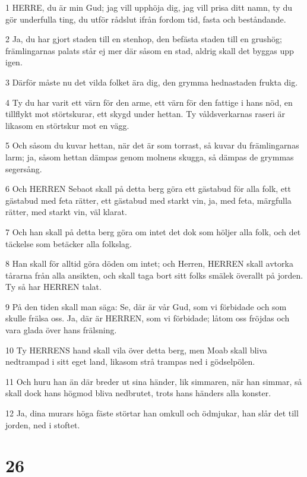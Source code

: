 \par 1 HERRE, du är min Gud; jag vill upphöja dig, jag vill prisa ditt namn, ty du gör underfulla ting, du utför rådslut ifrån fordom tid, fasta och beståndande.
\par 2 Ja, du har gjort staden till en stenhop, den befästa staden till en grushög; främlingarnas palats står ej mer där såsom en stad, aldrig skall det byggas upp igen.
\par 3 Därför måste nu det vilda folket ära dig, den grymma hednastaden frukta dig.
\par 4 Ty du har varit ett värn för den arme, ett värn för den fattige i hans nöd, en tillflykt mot störtskurar, ett skygd under hettan. Ty våldsverkarnas raseri är likasom en störtskur mot en vägg.
\par 5 Och såsom du kuvar hettan, när det är som torrast, så kuvar du främlingarnas larm; ja, såsom hettan dämpas genom molnens skugga, så dämpas de grymmas segersång.
\par 6 Och HERREN Sebaot skall på detta berg göra ett gästabud för alla folk, ett gästabud med feta rätter, ett gästabud med starkt vin, ja, med feta, märgfulla rätter, med starkt vin, väl klarat.
\par 7 Och han skall på detta berg göra om intet det dok som höljer alla folk, och det täckelse som betäcker alla folkslag.
\par 8 Han skall för alltid göra döden om intet; och Herren, HERREN skall avtorka tårarna från alla ansikten, och skall taga bort sitt folks smälek överallt på jorden. Ty så har HERREN talat.
\par 9 På den tiden skall man säga: Se, där är vår Gud, som vi förbidade och som skulle frälsa oss. Ja, där är HERREN, som vi förbidade; låtom oss fröjdas och vara glada över hans frälsning.
\par 10 Ty HERRENS hand skall vila över detta berg, men Moab skall bliva nedtrampad i sitt eget land, likasom strå trampas ned i gödselpölen.
\par 11 Och huru han än där breder ut sina händer, lik simmaren, när han simmar, så skall dock hans högmod bliva nedbrutet, trots hans händers alla konster.
\par 12 Ja, dina murars höga fäste störtar han omkull och ödmjukar, han slår det till jorden, ned i stoftet.

\chapter{26}

